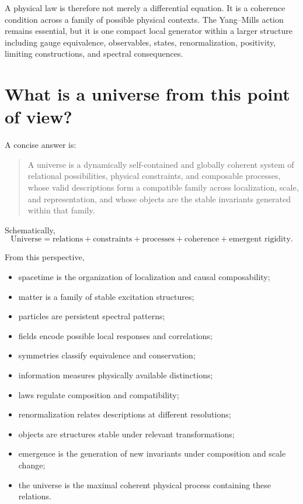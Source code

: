 \documentclass[11pt]{article}
\begin{document}
A physical law is therefore not merely a differential equation.  It is a
coherence condition across a family of possible physical contexts.  The
Yang--Mills action remains essential, but it is one compact local generator
within a larger structure including gauge equivalence, observables, states,
renormalization, positivity, limiting constructions, and spectral consequences.

\section{What is a universe from this point of view?}

A concise answer is:
\begin{quote}
A universe is a dynamically self-contained and globally coherent system of
relational possibilities, physical constraints, and composable processes,
whose valid descriptions form a compatible family across localization, scale,
and representation, and whose objects are the stable invariants generated
within that family.
\end{quote}

Schematically,
\begin{equation}
\boxed{
  \text{Universe}
  =
  \text{relations}
  +
  \text{constraints}
  +
  \text{processes}
  +
  \text{coherence}
  +
  \text{emergent rigidity}.}
  \label{eq:universe-definition}
\end{equation}

From this perspective,
\begin{itemize}[leftmargin=2em]
  \item spacetime is the organization of localization and causal
        composability;
  \item matter is a family of stable excitation structures;
  \item particles are persistent spectral patterns;
  \item fields encode possible local responses and correlations;
  \item symmetries classify equivalence and conservation;
  \item information measures physically available distinctions;
  \item laws regulate composition and compatibility;
  \item renormalization relates descriptions at different resolutions;
  \item objects are structures stable under relevant transformations;
  \item emergence is the generation of new invariants under composition and
        scale change;
  \item the universe is the maximal coherent physical process containing these
        relations.
\end{itemize}
\end{document}
